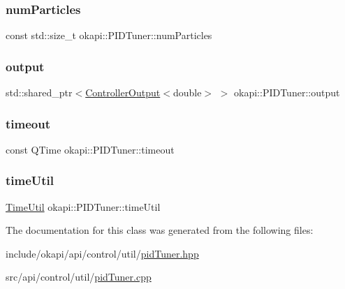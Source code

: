 \mbox{\label{classokapi_1_1PIDTuner_ae95d28fbed3acea4722a8f24a15d7d0b}} 
\subsubsection{\texorpdfstring{numParticles}{numParticles}}
{\footnotesize\ttfamily const std\+::size\+\_\+t okapi\+::\+P\+I\+D\+Tuner\+::num\+Particles\hspace{0.3cm}{\ttfamily [protected]}}

\mbox{\label{classokapi_1_1PIDTuner_ae97a91fa08ed6cfaabede054a550086a}} 
\subsubsection{\texorpdfstring{output}{output}}
{\footnotesize\ttfamily std\+::shared\+\_\+ptr$<$\mbox{\hyperlink{classokapi_1_1ControllerOutput}{Controller\+Output}}$<$double$>$ $>$ okapi\+::\+P\+I\+D\+Tuner\+::output\hspace{0.3cm}{\ttfamily [protected]}}

\mbox{\label{classokapi_1_1PIDTuner_aaaffccb9f7957dd55231828eaea7d1aa}} 
\subsubsection{\texorpdfstring{timeout}{timeout}}
{\footnotesize\ttfamily const Q\+Time okapi\+::\+P\+I\+D\+Tuner\+::timeout\hspace{0.3cm}{\ttfamily [protected]}}

\mbox{\label{classokapi_1_1PIDTuner_a60b56b9eb8afccaf712e9431cf7f081f}} 
\subsubsection{\texorpdfstring{timeUtil}{timeUtil}}
{\footnotesize\ttfamily \mbox{\hyperlink{classokapi_1_1TimeUtil}{Time\+Util}} okapi\+::\+P\+I\+D\+Tuner\+::time\+Util\hspace{0.3cm}{\ttfamily [protected]}}



The documentation for this class was generated from the following files\+:\begin{DoxyCompactItemize}
\item 
include/okapi/api/control/util/\mbox{\hyperlink{pidTuner_8hpp}{pid\+Tuner.\+hpp}}\item 
src/api/control/util/\mbox{\hyperlink{pidTuner_8cpp}{pid\+Tuner.\+cpp}}\end{DoxyCompactItemize}
